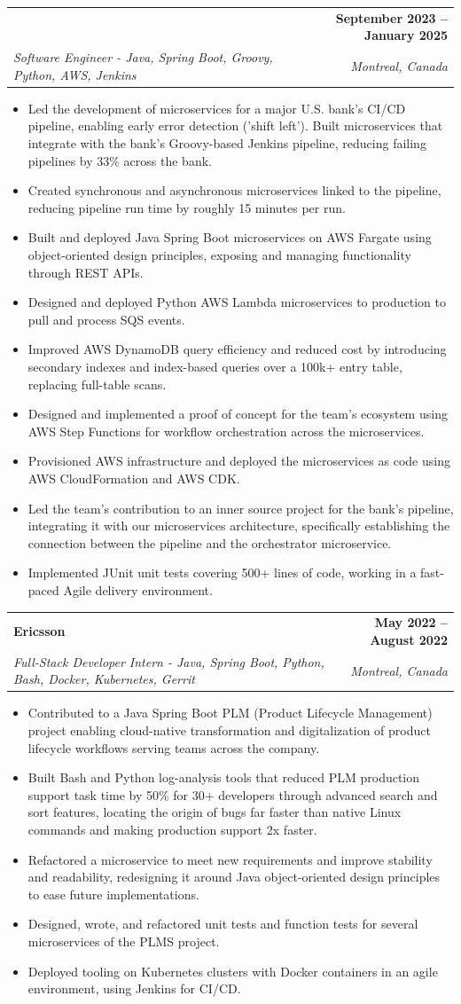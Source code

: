 \documentclass[letterpaper,11pt]{article}
\makeatletter
\newcommand{\resumeItem}[1]{
  \item\small{{#1 \vspace{-2pt}}}
}
\newcommand{\resumeSubheading}[4]{
  \vspace{-2pt}\item
    \begin{tabularx}{1.0\textwidth}[t]{@{}>{\raggedright\arraybackslash}X@{\hspace{8pt}}r@{}}
      \textbf{#1} & \textbf{\small #2} \\
      \textit{\small#3} & \textit{\small #4} \\
    \end{tabularx}\vspace{-7pt}
}
\newcommand{\resumeSubheadingContinued}[3]{
  \vspace{4pt}
    \begin{tabularx}{1.0\textwidth}[t]{@{}>{\raggedright\arraybackslash}X@{\hspace{8pt}}r@{}}
      & \textbf{\small #2} \\
      \textit{\small#1} & \textit{\small #3} \\
    \end{tabularx}\vspace{-7pt}
}
\newcommand{\resumeItemListStart}{\begin{itemize}}
\newcommand{\resumeItemListEnd}{\end{itemize}\vspace{-5pt}}
\makeatother
\begin{document}
    \resumeSubheadingContinued
      {Software Engineer - Java, Spring Boot, Groovy, Python, AWS, Jenkins}{September 2023 -- January 2025}{Montreal, Canada}
      \resumeItemListStart
        \resumeItem{Led the development of microservices for a major U.S. bank's CI/CD pipeline, enabling early error detection ('shift left'). Built microservices that integrate with the bank's Groovy-based Jenkins pipeline, reducing failing pipelines by 33\% across the bank.}
        \resumeItem{Created synchronous and asynchronous microservices linked to the pipeline, reducing pipeline run time by roughly 15 minutes per run.}
        \resumeItem{Built and deployed Java Spring Boot microservices on AWS Fargate using object-oriented design principles, exposing and managing functionality through REST APIs.}
        \resumeItem{Designed and deployed Python AWS Lambda microservices to production to pull and process SQS events.}
        \resumeItem{Improved AWS DynamoDB query efficiency and reduced cost by introducing secondary indexes and index-based queries over a 100k+ entry table, replacing full-table scans.}
        \resumeItem{Designed and implemented a proof of concept for the team's ecosystem using AWS Step Functions for workflow orchestration across the microservices.}
        \resumeItem{Provisioned AWS infrastructure and deployed the microservices as code using AWS CloudFormation and AWS CDK.}
        \resumeItem{Led the team's contribution to an inner source project for the bank's pipeline, integrating it with our microservices architecture, specifically establishing the connection between the pipeline and the orchestrator microservice.}
        \resumeItem{Implemented JUnit unit tests covering 500+ lines of code, working in a fast-paced Agile delivery environment.}
      \resumeItemListEnd

    \resumeSubheading
      {Ericsson}{May 2022 -- August 2022}
      {Full-Stack Developer Intern - Java, Spring Boot, Python, Bash, Docker, Kubernetes, Gerrit}{Montreal, Canada}
      \resumeItemListStart
        \resumeItem{Contributed to a Java Spring Boot PLM (Product Lifecycle Management) project enabling cloud-native transformation and digitalization of product lifecycle workflows serving teams across the company.}
        \resumeItem{Built Bash and Python log-analysis tools that reduced PLM production support task time by 50\% for 30+ developers through advanced search and sort features, locating the origin of bugs far faster than native Linux commands and making production support 2x faster.}
        \resumeItem{Refactored a microservice to meet new requirements and improve stability and readability, redesigning it around Java object-oriented design principles to ease future implementations.}
        \resumeItem{Designed, wrote, and refactored unit tests and function tests for several microservices of the PLMS project.}
        \resumeItem{Deployed tooling on Kubernetes clusters with Docker containers in an agile environment, using Jenkins for CI/CD.}
      \resumeItemListEnd
\end{document}
